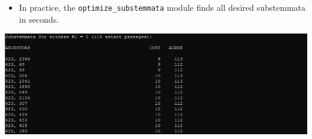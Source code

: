 \documentclass[10pt]{beamer}
\begin{document}
	\begin{frame}
		\begin{itemize}
			\item In practice, the \texttt{optimize\_substemmata} module finds all desired substemmata in seconds.
		\end{itemize}
		\begin{center}
			\includegraphics[scale=0.5]{../img/optimize-substemmata-5_bound-10.png}
		\end{center}
	\end{frame}
\end{document}
